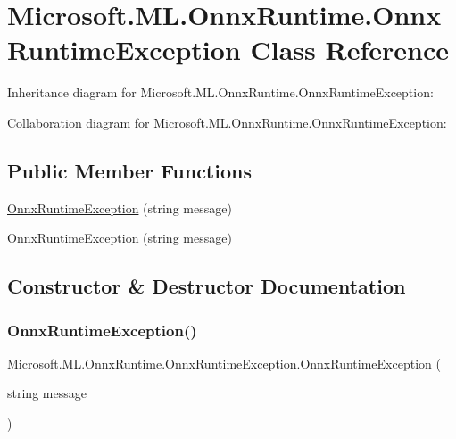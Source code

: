 \hypertarget{classMicrosoft_1_1ML_1_1OnnxRuntime_1_1OnnxRuntimeException}{}\section{Microsoft.\+M\+L.\+Onnx\+Runtime.\+Onnx\+Runtime\+Exception Class Reference}
\label{classMicrosoft_1_1ML_1_1OnnxRuntime_1_1OnnxRuntimeException}


Inheritance diagram for Microsoft.\+M\+L.\+Onnx\+Runtime.\+Onnx\+Runtime\+Exception\+:


Collaboration diagram for Microsoft.\+M\+L.\+Onnx\+Runtime.\+Onnx\+Runtime\+Exception\+:
\subsection*{Public Member Functions}
\begin{DoxyCompactItemize}
\item 
\mbox{\hyperlink{classMicrosoft_1_1ML_1_1OnnxRuntime_1_1OnnxRuntimeException_ae09ce84131105971a01bde8e90445acb}{Onnx\+Runtime\+Exception}} (string message)
\item 
\mbox{\hyperlink{classMicrosoft_1_1ML_1_1OnnxRuntime_1_1OnnxRuntimeException_ae09ce84131105971a01bde8e90445acb}{Onnx\+Runtime\+Exception}} (string message)
\end{DoxyCompactItemize}


\subsection{Constructor \& Destructor Documentation}
\mbox{\label{classMicrosoft_1_1ML_1_1OnnxRuntime_1_1OnnxRuntimeException_ae09ce84131105971a01bde8e90445acb}} 
\subsubsection{\texorpdfstring{Onnx\+Runtime\+Exception()}{OnnxRuntimeException()}\hspace{0.1cm}{\footnotesize\ttfamily [1/2]}}
{\footnotesize\ttfamily Microsoft.\+M\+L.\+Onnx\+Runtime.\+Onnx\+Runtime\+Exception.\+Onnx\+Runtime\+Exception (\begin{DoxyParamCaption}\item[{string}]{message }\end{DoxyParamCaption})\hspace{0.3cm}{\ttfamily [inline]}}


